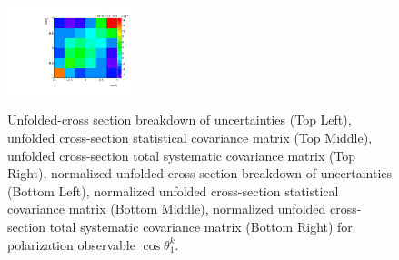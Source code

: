\begin{figure}[htb]
\begin{center}
 \includegraphics[width=0.32\textwidth]{fig_fullRun2UL/unfolding/combined/TotalSystCovMatrixNorm_rebinnedB_b1k.pdf} \\
\caption{Unfolded-cross section breakdown of uncertainties (Top Left), unfolded cross-section statistical covariance matrix (Top Middle), unfolded cross-section total systematic covariance matrix (Top Right), normalized unfolded-cross section breakdown of uncertainties (Bottom Left), normalized unfolded cross-section statistical covariance matrix (Bottom Middle), normalized unfolded cross-section total systematic covariance matrix (Bottom Right) for polarization observable $\cos\theta_{1}^{k}$.}
\label{fig:b1k_uncertainties}
\end{center}
\end{figure}
\clearpage
